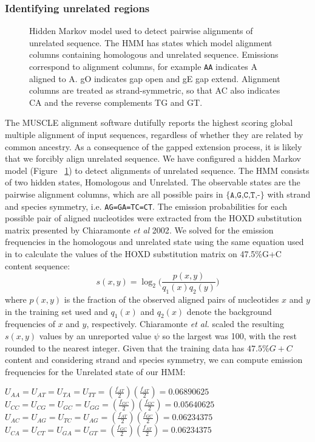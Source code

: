 \documentclass{ws-procs975x65}
\begin{document}
\subsubsection{Identifying unrelated regions}
\begin{figure}[t]
\centering {}
\caption{Hidden Markov model used to detect pairwise alignments of unrelated sequence. The HMM has states which model alignment columns containing homologous and unrelated sequence.  Emissions correspond to alignment columns, for example \texttt{AA} indicates A aligned to A.  gO indicates gap open and gE gap extend. Alignment columns are treated as strand-symmetric, so that AC also indicates CA and the reverse complements TG and GT.}
\label{fig-hmm}\vspace{-0.2cm}
\end{figure}
The MUSCLE alignment software dutifully reports the highest scoring global multiple alignment of input sequences, regardless of whether they are related by common ancestry. As a consequence of the gapped extension process, it is likely that we forcibly align unrelated sequence. We have configured a hidden Markov model (Figure ~\ref{fig-hmm}) to detect alignments of unrelated sequence. The HMM consists of two hidden states, Homologous and Unrelated. The observable states are the pairwise alignment columns, which are all possible pairs in $\texttt{{\{A,G,C,T,-\}}}$ with strand and species symmetry, i.e. \texttt{AG=GA=TC=CT}.  The emission probabilities for each possible pair of aligned nucleotides were extracted from the HOXD substitution matrix presented by Chiaramonte \textit{et al} 2002\cite{hoxd}. We solved for the emission frequencies in the homologous and unrelated state using the same equation used in to calculate the values of the HOXD substitution matrix on 47.5\%G+C content sequence\cite{hoxd}:
\begin{equation}
s(x,y)= \log_{2}{\Bigg(\frac{p(x,y)}{q_{1}(x)q_{2}(y)}\Bigg)}
\end{equation}
where $p(x,y)$ is the fraction of the observed aligned pairs of nucleotides $x$ and $y$ in the training set used and $q_{1}(x)$ and $q_{2}(x)$ denote the background frequencies of $x$ and $y$, respectively. Chiaramonte \textit{et al.} scaled the resulting $s(x,y)$ values by an unreported value $\psi$ so the largest was 100, with the rest rounded to the nearest integer.  Given that the training data has $47.5\%G+C$ content and considering strand and species symmetry, we can compute emission frequencies for the Unrelated state of our HMM: \begin{center}$U_{AA}=U_{AT}=U_{TA}=U_{TT}=(\frac{f_{AT}}{2})(\frac{f_{AT}}{2}) = 0.06890625$ \\
$U_{CC}=U_{CG}=U_{GC}=U_{GG}=(\frac{f_{GC}}{2})(\frac{f_{GC}}{2}) = 0.05640625$ \\
$U_{AC}=U_{AG}=U_{TC}=U_{AG}=(\frac{f_{AT}}{2})(\frac{f_{GC}}{2}) = 0.06234375$ \\
$U_{CA}=U_{CT}=U_{GA}=U_{GT}=(\frac{f_{GC}}{2})(\frac{f_{AT}}{2}) = 0.06234375$ \\
\end{center}
\end{document}
